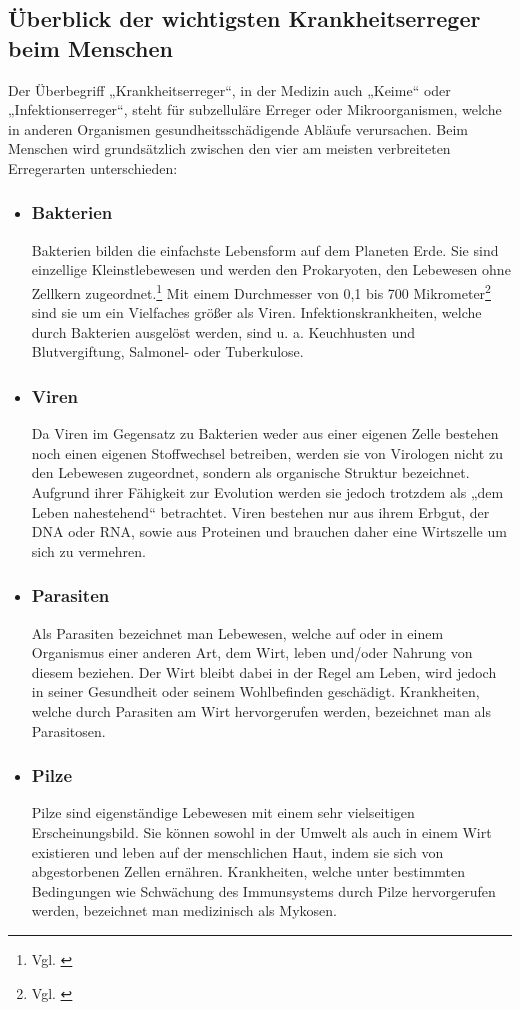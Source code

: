 \documentclass[12pt]{article}
\begin{document}
\subsection{Überblick der wichtigsten Krankheitserreger beim Menschen}
Der Überbegriff „Krankheitserreger“, in der Medizin auch „Keime“ oder „Infektionserreger“, steht für subzelluläre Erreger oder Mikroorganismen, welche in anderen Organismen gesundheitsschädigende Abläufe verursachen. Beim Menschen wird grundsätzlich zwischen den vier am meisten verbreiteten Erregerarten unterschieden:
\begin{itemize}
    \item \subsubsection{Bakterien}
    Bakterien bilden die einfachste Lebensform auf dem Planeten Erde. Sie sind einzellige Kleinstlebewesen und werden den Prokaryoten, den Lebewesen ohne Zellkern zugeordnet.\footnote{Vgl. \cite{Nagel2021}} Mit einem Durchmesser von 0,1 bis 700 Mikrometer\footnote{Vgl. \cite{BZgA2021}} sind sie um ein Vielfaches größer als Viren. Infektionskrankheiten, welche durch Bakterien ausgelöst werden, sind u. a. Keuchhusten und Blutvergiftung, Salmonel- oder Tuberkulose.
    \item \subsubsection{Viren}
    Da Viren im Gegensatz zu Bakterien weder aus einer eigenen Zelle bestehen noch einen eigenen Stoffwechsel betreiben, werden sie von Virologen nicht zu den Lebewesen zugeordnet, sondern als organische Struktur bezeichnet. Aufgrund ihrer Fähigkeit zur Evolution werden sie jedoch trotzdem als „dem Leben nahestehend“ betrachtet. Viren bestehen nur aus ihrem Erbgut, der DNA oder RNA, sowie aus Proteinen und brauchen daher eine Wirtszelle um sich zu vermehren.
    \item \subsubsection{Parasiten}
    Als Parasiten bezeichnet man Lebewesen, welche auf oder in einem Organismus einer anderen Art, dem Wirt, leben und/oder Nahrung von diesem beziehen. Der Wirt bleibt dabei in der Regel am Leben, wird jedoch in seiner Gesundheit oder seinem Wohlbefinden geschädigt. Krankheiten, welche durch Parasiten am Wirt hervorgerufen werden, bezeichnet man als Parasitosen. 
    \item \subsubsection{Pilze}
    Pilze sind eigenständige Lebewesen mit einem sehr vielseitigen Erscheinungsbild. Sie können sowohl in der Umwelt als auch in einem Wirt existieren und leben auf der menschlichen Haut, indem sie sich von abgestorbenen Zellen ernähren. Krankheiten, welche unter bestimmten Bedingungen wie Schwächung des Immunsystems durch Pilze hervorgerufen werden, bezeichnet man medizinisch als Mykosen.
    
\end{itemize}
\end{document}
